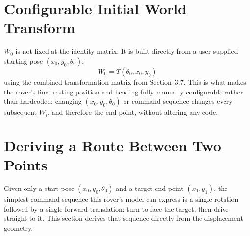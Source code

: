 \documentclass[12pt]{report}
\begin{document}
\section{Configurable Initial World Transform}
$W_0$ is not fixed at the identity matrix. It is built directly from a user-supplied starting pose $(x_0, y_0, \theta_0)$:
\begin{equation}
W_0 = T(\theta_0, x_0, y_0)
\end{equation}
using the combined transformation matrix from Section~3.7. This is what makes the rover's final resting position and heading fully manually configurable rather than hardcoded: changing $(x_0,y_0,\theta_0)$ or command sequence changes every subsequent $W_i$, and therefore the end point, without altering any code.

\section{Deriving a Route Between Two Points}
Given only a start pose $(x_0, y_0, \theta_0)$ and a target end point $(x_1, y_1)$, the simplest command sequence this rover's model can express is a single rotation followed by a single forward translation: turn to face the target, then drive straight to it. This section derives that sequence directly from the displacement geometry.
\end{document}
